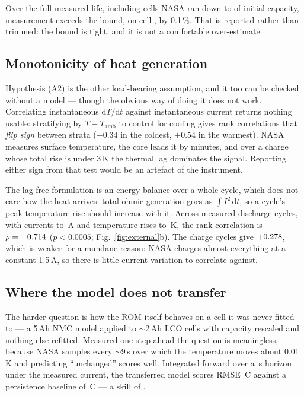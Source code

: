 \documentclass[11pt,letterpaper]{article}
\theoremstyle{definition}
\theoremstyle{remark}
\newcommand{\SI}[2]{#1\,#2}
\newcommand{\degreeCelsius}{\degC}
\newcommand{\degC}{\ifmmode{^\circ}\mathrm{C}\else\textdegree C\fi}
\begin{document}
Over the full measured life, including cells NASA ran down to \nCapWorst{} of initial capacity,
\nViolations{} measurement exceeds the bound, on cell \nWorstCell{}, by 0.1\,\%. That is
reported rather than trimmed: the bound is tight, and it is not a comfortable over-estimate.

\subsection{Monotonicity of heat generation}

Hypothesis (A2) is the other load-bearing assumption, and it too can be checked without a model
--- though the obvious way of doing it does not work. Correlating
instantaneous $\mathrm{d}T/\mathrm{d}t$ against instantaneous current returns nothing usable:
stratifying by $T-T_{\mathrm{amb}}$ to control for cooling gives rank correlations that
\emph{flip sign} between strata ($-0.34$ in the coldest, $+0.54$ in the warmest). NASA measures
surface temperature, the core leads it by minutes, and over a charge whose total rise is under
3\,K the thermal lag dominates the signal. Reporting either sign from that test would be an
artefact of the instrument.

The lag-free formulation is an energy balance over a whole cycle, which does not care how the
heat arrives: total ohmic generation goes as $\int I^2\,\mathrm{d}t$, so a cycle's peak
temperature rise should increase with it. Across \nDisCycles{} measured discharge cycles, with
currents to \nMaxI\,A and temperature rises to \nMaxDT\,K, the rank correlation is
\textbf{$\rho = +0.714$} ($p < 0.0005$; Fig.~\ref{fig:external}b). The charge cycles give
$+0.278$, which is weaker for a mundane reason: NASA charges almost everything at a constant
1.5\,A, so there is little current variation to correlate against.

\subsection{Where the model does not transfer}

The harder question is how the ROM itself behaves on a cell it was never fitted to --- a 5\,Ah
NMC model applied to $\sim$2\,Ah LCO cells with capacity rescaled and nothing else refitted.
Measured one step ahead the question is meaningless, because NASA samples every $\sim$9\,s over
which the temperature moves about 0.01\,K and predicting ``unchanged'' scores well. Integrated
forward over a \nHorizon\,s horizon under the measured current, the transferred model scores
RMSE \SI{\nRMSE}{\degreeCelsius} against a persistence baseline of \SI{\nPersist}{\degreeCelsius} --- a skill of
\nSkill{}.
\end{document}
